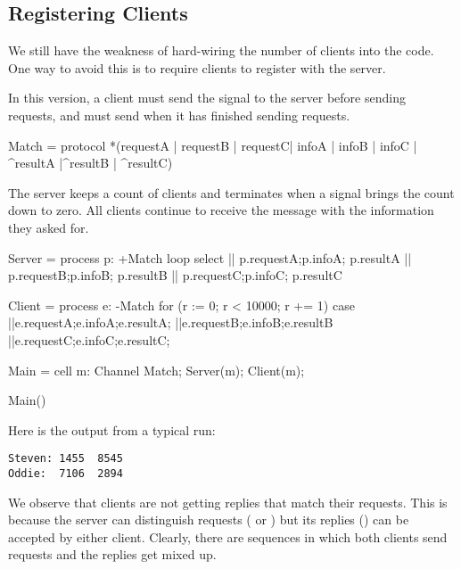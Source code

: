 \subsection{Registering Clients}

We still have the weakness of hard-wiring the number of clients into the code.  One way to avoid this is to require clients to register with the server.

In this version, a client must send the signal  to the server before sending requests, and must send  when it has finished sending requests.
\begin{code}
Match = protocol { *(requestA | requestB | requestC| infoA | infoB | infoC | ^resultA |^resultB | ^resultC) }
\end{code}

The server keeps a count of clients and terminates when a  signal brings the count down to zero.  All clients continue to receive the message  with the information they asked for.
\begin{code}
Server = process p: +Match
{
  loop select
  {
    || p.requestA;p.infoA; p.resultA
    || p.requestB;p.infoB; p.resultB
    || p.requestC;p.infoC; p.resultC
  }
}

Client = process e: -Match
{
  for (r := 0; r < 10000; r += 1)
  {
        case
        {
            ||e.requestA;e.infoA;e.resultA;
            ||e.requestB;e.infoB;e.resultB
            ||e.requestC;e.infoC;e.resultC;
        }
  }
}

Main = cell
{
  m: Channel Match;
  Server(m);
  Client(m);
}

Main()
\end{code}

Here is the output from a typical run:
\begin{verbatim}
Steven: 1455  8545
Oddie:  7106  2894
\end{verbatim}

We observe that clients are not getting replies that match their requests.  This is because the server can distinguish requests ( or ) but its replies () can be accepted by either client.  Clearly, there are sequences in which both clients send requests and the replies get mixed up.

